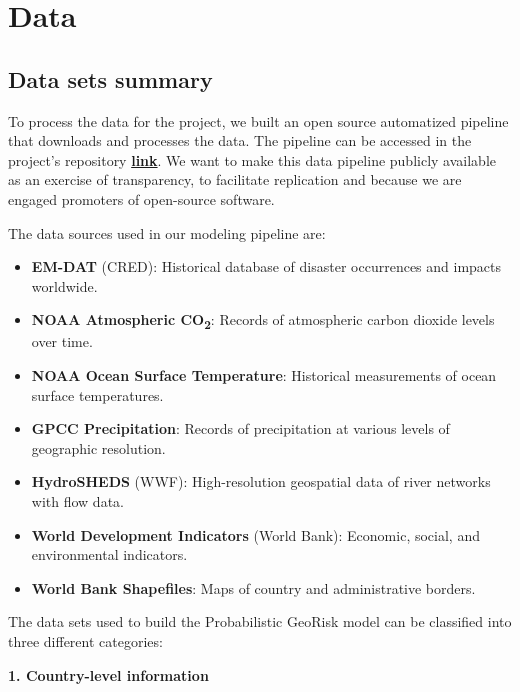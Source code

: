 
\section{Data}
\label{sec:data}

\subsection{Data sets summary}

To process the data for the project, we built an open source automatized pipeline that downloads and processes the data. The pipeline can be accessed in the project's repository \href{https://github.com/jessegrabowski/laos-climate-change/tree/main/laos_gggi/data_functions}{\textbf{link}}. We want to make this data pipeline publicly available as an exercise of transparency, to facilitate replication and because we are engaged promoters of open-source software.

The data sources used in our modeling pipeline are:
\begin{itemize}
    \item \textbf{EM-DAT} (CRED): Historical database of disaster occurrences and impacts worldwide.
    \item \textbf{NOAA Atmospheric CO\textsubscript{2}}: Records of atmospheric carbon dioxide levels over time.
    \item \textbf{NOAA Ocean Surface Temperature}: Historical measurements of ocean surface temperatures.
    \item \textbf{GPCC Precipitation}: Records of precipitation at various levels of geographic resolution.
    \item \textbf{HydroSHEDS} (WWF): High-resolution geospatial data of river networks with flow data.
    \item \textbf{World Development Indicators} (World Bank): Economic, social, and environmental indicators.
    \item \textbf{World Bank Shapefiles}: Maps of country and administrative borders.
\end{itemize}

The data sets used to build the Probabilistic GeoRisk model can be classified into three different categories:

\textbf{1. Country-level information}

